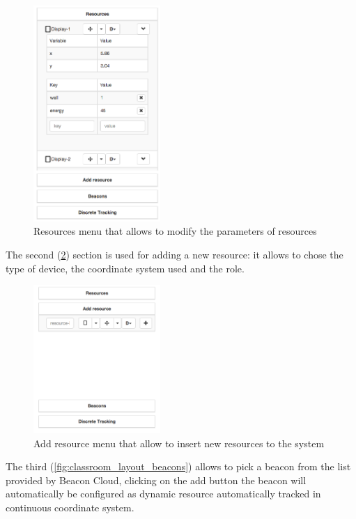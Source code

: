 \begin{figure}
\centering
\includegraphics[width=1.9in]{images/classroom-layout-resources.png}
\caption{Resources menu that allows to modify the parameters of resources}
\label{fig:classroom_layout_resources}
\end{figure}

The second (\ref{fig:classroom_layout_add}) section is used for adding a new resource: it allows to chose the type of device, the coordinate system used and the role. 

\begin{figure}
\centering
\includegraphics[width=1.9in]{images/classroom-layout-add-resource.png}
\caption{Add resource menu that allow to insert new resources to the system}
\label{fig:classroom_layout_add}
\end{figure}

The third (\ref{fig:classroom_layout_beacons}) allows to pick a beacon from the list provided by Beacon Cloud, clicking on the add button the beacon will automatically be configured as dynamic resource automatically tracked in continuous coordinate system.

